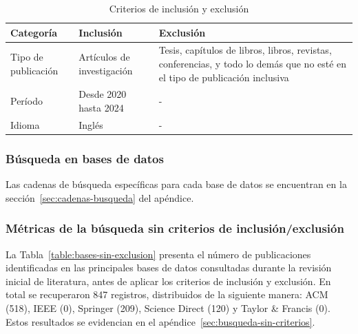 \begin{table}[H]
	\centering
	\caption{Criterios de inclusión y exclusión}
	\fontsize{9pt}{10pt}\selectfont %
	\begin{tabular}{|p{3cm}|p{5cm}|p{6cm}|}
		\hline
		\textbf{Categoría}  & \textbf{Inclusión}         & \textbf{Exclusión}                                                                                                          \\
		\hline
		Tipo de publicación & Artículos de investigación & Tesis, capítulos de libros, libros, revistas, conferencias, y todo lo demás que no esté en el tipo de publicación inclusiva \\
		\hline
		Período             & Desde 2020 hasta 2024      & -                                                                                                                           \\
		\hline
		Idioma              & Inglés                     & -                                                                                                                           \\
		\hline
	\end{tabular}
	\label{table:criterios-inclusion-exclusion}
\end{table}







\subsubsection{Búsqueda en bases de datos}\label{par:busquedaBasesDatos}
\noindent
Las cadenas de búsqueda específicas para cada base de datos se encuentran en la sección~\ref{sec:cadenas-busqueda} del apéndice.

\subsubsection{Métricas de la búsqueda sin criterios de inclusión/exclusión}\label{subsubsec:resumenBusqueda}
\noindent
La Tabla~\ref{table:bases-sin-exclusion} presenta el número de publicaciones identificadas en las principales bases de datos consultadas durante la revisión inicial de literatura, antes de aplicar los criterios de inclusión y exclusión. En total se recuperaron 847 registros, distribuidos de la siguiente manera: ACM (518), IEEE (0), Springer (209), Science Direct (120) y Taylor \& Francis (0). Estos resultados se evidencian en el apéndice~\ref{sec:busqueda-sin-criterios}.

